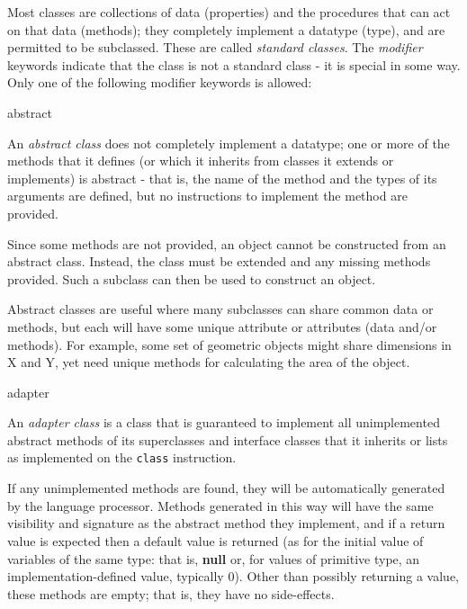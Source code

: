 Most classes are collections of data (properties) and the procedures
that can act on that data (methods); they completely implement a
datatype (type), and are permitted to be subclassed.
These are called \emph{standard classes}.
The \emph{modifier} keywords indicate that the class is not a standard
class - it is special in some way.
Only one of the following modifier keywords is allowed:
\begin{description}
\item{abstract}

An \emph{abstract class} does not completely implement a datatype; one
or more of the methods that it defines (or which it inherits from
classes it extends or implements) is abstract - that is, the name
of the method and the types of its arguments are defined, but no
instructions to implement the method are provided.
 
Since some methods are not provided, an object cannot be constructed
from an abstract class.  Instead, the class must be extended and any
missing methods provided.  Such a subclass can then be used to construct
an object.
 
Abstract classes are useful where many subclasses can share common data
or methods, but each will have some unique attribute or attributes (data
and/or methods).  For example, some set of geometric objects might share
dimensions in X and Y, yet need unique methods for calculating the area
of the object.
\item{adapter}

An \emph{adapter class} is a class that is guaranteed to implement all
unimplemented abstract methods of its superclasses and interface classes
that it inherits or lists as implemented on the \texttt{class} instruction.
 
If any unimplemented methods are found, they will be automatically
generated by the language processor.  Methods generated in this way will
have the same visibility and signature as the abstract method they
implement, and if a return value is expected then a default value is
returned (as for the initial value of variables of the same type: that
is, \textbf{null} or, for values of primitive type, an
implementation-defined value, typically 0).  Other than possibly
returning a value, these methods are empty; that is, they have no
side-effects.
 

\end{description}
